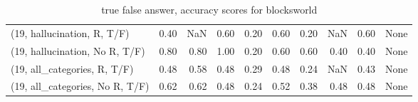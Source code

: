 \begin{table*}[h!]
\begin{adjustbox}{width=2\columnwidth,center}
\begin{tabular}{lrrr|rrr|rrr}
(19, hallucination, R, T/F)           &                      0.40 &                   NaN &                      0.60 &                          0.20 &                      0.60 &                          0.20 &                                    NaN &                               0.60 &                                  None \\
(19, hallucination, No R, T/F)        &                      0.80 &                  0.80 &                      1.00 &                          0.20 &                      0.60 &                          0.60 &                                   0.40 &                               0.40 &                                  None \\
(19, all\_categories, R, T/F)          &                      0.48 &                  0.58 &                      0.48 &                          0.29 &                      0.48 &                          0.24 &                                    NaN &                               0.43 &                                  None \\
(19, all\_categories, No R, T/F)       &                      0.62 &                  0.62 &                      0.48 &                          0.24 &                      0.52 &                          0.38 &                                   0.48 &                               0.48 &                                  None \\


\bottomrule
\end{tabular}
\end{adjustbox}
\caption{true false answer, accuracy scores for blocksworld}
\end{table*}